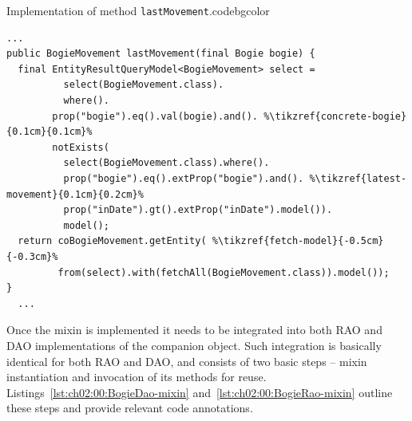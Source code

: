   \begin{code}{Implementation of method \texttt{lastMovement}.}{\label{lst:ch02:00:BogieMixin-impl}}{codebgcolor}
  \begin{lstlisting}
...
public BogieMovement lastMovement(final Bogie bogie) { 
  final EntityResultQueryModel<BogieMovement> select = 
	      select(BogieMovement.class).
	      where().
		prop("bogie").eq().val(bogie).and(). %\tikzref{concrete-bogie}{0.1cm}{0.1cm}%
		notExists(
		  select(BogieMovement.class).where(). 
		  prop("bogie").eq().extProp("bogie").and(). %\tikzref{latest-movement}{0.1cm}{0.2cm}%
		  prop("inDate").gt().extProp("inDate").model()).
	      model();
  return coBogieMovement.getEntity( %\tikzref{fetch-model}{-0.5cm}{-0.3cm}%
         from(select).with(fetchAll(BogieMovement.class)).model());    
}
  ...
  \end{lstlisting}
  \vspace*{-7px}
\end{code}
 
  Once the mixin is implemented it needs to be integrated into both RAO and DAO implementations of the companion object.
  Such integration is basically identical for both RAO and DAO, and consists of two basic steps -- mixin instantiation and invocation of its methods for reuse.
  Listings~\ref{lst:ch02:00:BogieDao-mixin} and~\ref{lst:ch02:00:BogieRao-mixin} outline these steps and provide relevant code annotations.
  
